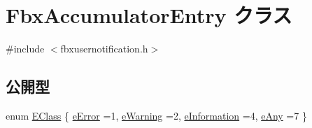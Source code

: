 \hypertarget{class_fbx_accumulator_entry}{}\section{Fbx\+Accumulator\+Entry クラス}
\label{class_fbx_accumulator_entry}


{\ttfamily \#include $<$fbxusernotification.\+h$>$}

\subsection*{公開型}
\begin{DoxyCompactItemize}
\item 
enum \hyperlink{class_fbx_accumulator_entry_af08af3ddcbf7e8fe642d7e9ecb4ad0e2}{E\+Class} \{ \hyperlink{class_fbx_accumulator_entry_af08af3ddcbf7e8fe642d7e9ecb4ad0e2a9e327e2f495f49a576e16f4050231aff}{e\+Error} =1, 
\hyperlink{class_fbx_accumulator_entry_af08af3ddcbf7e8fe642d7e9ecb4ad0e2a02238ae4f2cce7a190dad59cfb3e9c19}{e\+Warning} =2, 
\hyperlink{class_fbx_accumulator_entry_af08af3ddcbf7e8fe642d7e9ecb4ad0e2ace66165782fe6efde70c8d93361c8ded}{e\+Information} =4, 
\hyperlink{class_fbx_accumulator_entry_af08af3ddcbf7e8fe642d7e9ecb4ad0e2a2970874fc582ec77e50a82bb850d983b}{e\+Any} =7
 \}
\end{DoxyCompactItemize}
